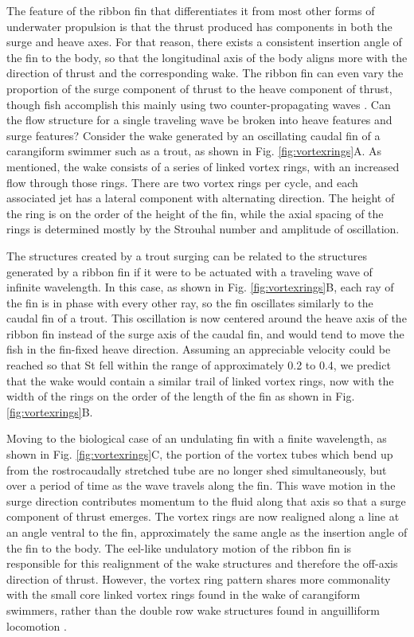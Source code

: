 \documentclass[onecolumn]{IEEEtran}
\begin{document}
The feature of the ribbon fin that differentiates it from most other forms of
underwater propulsion is that the thrust produced has components in both
the surge and heave axes. For that reason, there exists a
consistent insertion angle of the fin to the body, so that the
longitudinal axis of the body aligns more with the direction of thrust and the corresponding wake.
The ribbon fin can even vary the proportion of the surge component of
thrust to the heave component of thrust, though fish accomplish this
mainly using two counter-propagating waves \citep*{Cure11b,Sefa12a}. Can the
flow structure for a single traveling wave be broken into heave features
and surge features? Consider the wake generated by an oscillating caudal
fin of a carangiform swimmer such as a trout, as shown in Fig.
\ref{fig:vortexrings}A. As mentioned, the wake consists of a series of
linked vortex rings, with an increased flow through those rings. There are two
vortex rings per cycle, and each associated jet has a lateral component
with alternating direction. The height of the ring is on the order of the
height of the fin, while the axial spacing of the rings is determined mostly by
the Strouhal number and amplitude of oscillation.

The structures created by a trout surging can be related to the
structures generated by a ribbon fin if it were to be actuated with a traveling
wave of infinite wavelength. In this
case, as shown in Fig. \ref{fig:vortexrings}B, each ray of the fin is in
phase with every other ray, so the fin oscillates similarly to the caudal
fin of a trout. This oscillation is now centered around the heave axis of
the ribbon fin instead of the surge axis of the caudal fin, and would tend
to move the fish in the fin-fixed heave direction. Assuming an appreciable
velocity could be reached so that St fell within the range of
approximately 0.2 to 0.4, we predict that the wake would contain a similar trail of linked
vortex rings, now with the width of the rings on the order of the length
of the fin as shown in Fig. \ref{fig:vortexrings}B.

Moving to the biological case of an undulating fin with a finite
wavelength, as shown in Fig. \ref{fig:vortexrings}C, the portion of the vortex tubes
which bend up from the rostrocaudally stretched tube are no longer shed
simultaneously, but over a period of time as the wave travels along the
fin. This wave motion in the surge direction contributes momentum to the
fluid along that axis so that a surge component of thrust emerges. The
vortex rings are now realigned along a line at an angle ventral to the
fin, approximately the same angle as the insertion angle of the fin to the
body. The eel-like undulatory motion of the ribbon fin is responsible for
this realignment of the wake structures and therefore the off-axis
direction of thrust. However, the vortex ring pattern shares more
commonality with the small core linked vortex rings found in the wake of
carangiform swimmers, rather than the double row wake structures found in
anguilliform locomotion \citep*{Tyte04a,Kern06a}.
\end{document}
